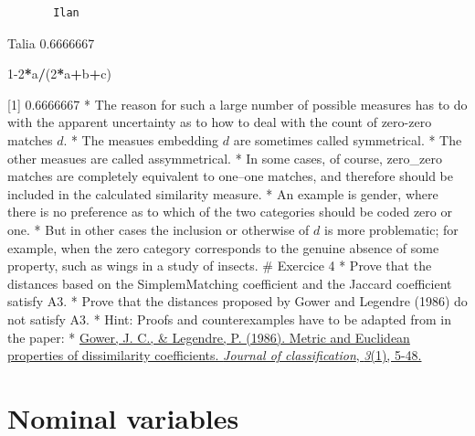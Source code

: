 \documentclass[
]{article}
\newenvironment{Shaded}{\begin{snugshade}}{\end{snugshade}}
\newcommand{\DecValTok}[1]{\textcolor[rgb]{0.00,0.00,0.81}{#1}}
\newcommand{\NormalTok}[1]{#1}
\newcommand{\OperatorTok}[1]{\textcolor[rgb]{0.81,0.36,0.00}{\textbf{#1}}}
\begin{document}
\begin{verbatim}
       Ilan
\end{verbatim}

Talia 0.6666667

\begin{Shaded}
\begin{Highlighting}[]
\DecValTok{1-2}\OperatorTok{*}\NormalTok{a}\OperatorTok{/}\NormalTok{(}\DecValTok{2}\OperatorTok{*}\NormalTok{a}\OperatorTok{+}\NormalTok{b}\OperatorTok{+}\NormalTok{c)}
\end{Highlighting}
\end{Shaded}

{[}1{]} 0.6666667 * The reason for such a large number of possible
measures has to do with the apparent uncertainty as to how to deal with
the count of zero-zero matches \(d\). * The measues embedding \(d\) are
sometimes called symmetrical. * The other measues are called
assymmetrical. * In some cases, of course, zero\_zero matches are
completely equivalent to one--one matches, and therefore should be
included in the calculated similarity measure. * An example is gender,
where there is no preference as to which of the two categories should be
coded zero or one. * But in other cases the inclusion or otherwise of
\(d\) is more problematic; for example, when the zero category
corresponds to the genuine absence of some property, such as wings in a
study of insects. \# Exercice 4 * Prove that the distances based on the
SimplemMatching coefficient and the Jaccard coefficient satisfy A3. *
Prove that the distances proposed by Gower and Legendre (1986) do not
satisfy A3. * Hint: Proofs and counterexamples have to be adapted from
in the paper: *
\href{https://drive.google.com/file/d/1PUQ7g9HIwwUG0CXbCsLA03hnApWMhjka/view?usp=drivesdk}{Gower,
J. C., \& Legendre, P. (1986). Metric and Euclidean properties of
dissimilarity coefficients. \emph{Journal of classification},
\emph{3}(1), 5-48.}

\hypertarget{nominal-variables}{%
\section{Nominal variables}\label{nominal-variables}}
\end{document}

